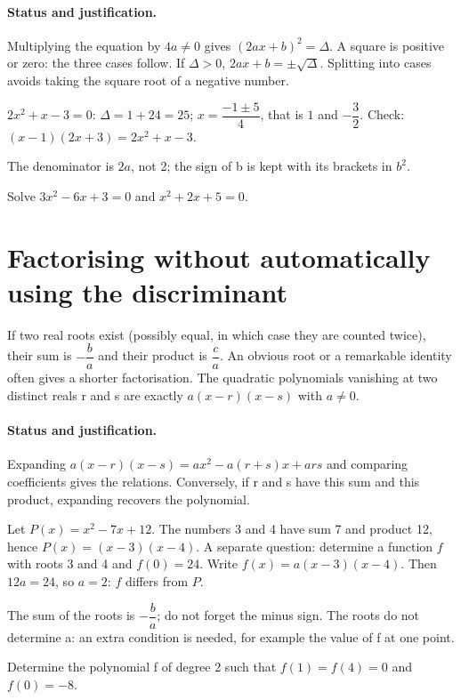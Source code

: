 \paragraph{Status and justification.} Multiplying the equation by $4a\ne0$ gives $(2ax+b)^2=\Delta$. A square is positive or zero: the three cases follow. If $\Delta>0$, $2ax+b=\pm\sqrt\Delta$. Splitting into cases avoids taking the square root of a negative number.
\begin{example}$2x^2+x-3=0$: $\Delta=1+24=25$; $x=\dfrac{-1\pm5}{4}$, that is $1$ and $-\dfrac{3}{2}$. Check: $(x-1)(2x+3)=2x^2+x-3$.\end{example}\label{C02-EX2}
\begin{pitfall}The denominator is $2a$, not 2; the sign of b is kept with its brackets in $b^2$.\end{pitfall}
\begin{application}Solve $3x^2-6x+3=0$ and $x^2+2x+5=0$.\end{application}\label{C02-AP2}
\section{Factorising without automatically using the discriminant}\label{C02-U3}
\begin{keypoint}
If two real roots exist (possibly equal, in which case they are counted twice), their sum is $-\dfrac{b}{a}$ and their product is $\dfrac{c}{a}$. An obvious root or a remarkable identity often gives a shorter factorisation. The quadratic polynomials vanishing at two distinct reals r and s are exactly $a(x-r)(x-s)$ with $a\ne0$.
\end{keypoint}
\paragraph{Status and justification.} Expanding $a(x-r)(x-s)=ax^2-a(r+s)x+ars$ and comparing coefficients gives the relations. Conversely, if r and s have this sum and this product, expanding recovers the polynomial.
\begin{example}Let $P(x)=x^2-7x+12$. The numbers 3 and 4 have sum 7 and product 12, hence $P(x)=(x-3)(x-4)$. A separate question: determine a function $f$ with roots 3 and 4 and $f(0)=24$. Write $f(x)=a(x-3)(x-4)$. Then $12a=24$, so $a=2$: $f$ differs from $P$.\end{example}\label{C02-EX3}
\begin{pitfall}The sum of the roots is $-\dfrac{b}{a}$; do not forget the minus sign. The roots do not determine a: an extra condition is needed, for example the value of f at one point.\end{pitfall}
\begin{application}Determine the polynomial f of degree 2 such that $f(1)=f(4)=0$ and $f(0)=-8$.\end{application}\label{C02-AP3}
